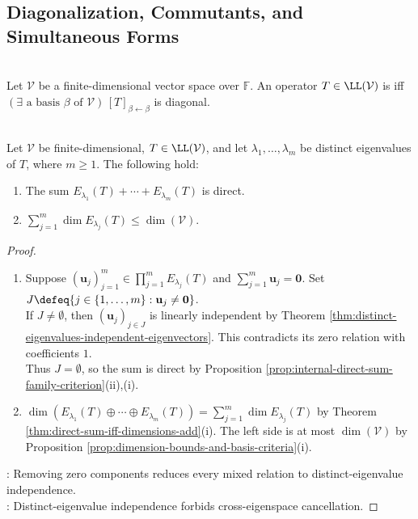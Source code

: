 \subsection{Diagonalization, Commutants, and Simultaneous Forms}

\begin{definition} \label{def:diagonalizable-operator} \\
Let $\mathcal{V}$ be a finite-dimensional vector space over $\mathbb{F}$. An operator $T\in\LL(\mathcal{V})$ is  iff $(\exists\text{ a basis }\beta\text{ of }\mathcal{V})\,[T]_{\beta\leftarrow\beta}$ is diagonal.
\end{definition}

\begin{proposition} \label{prop:eigenspaces-for-distinct-eigenvalues-form-direct-sum} \\
Let $\mathcal{V}$ be finite-dimensional, $T\in\LL(\mathcal{V})$, and let $\lambda_1,\ldots,\lambda_m$ be distinct eigenvalues of $T$, where $m\geq1$. The following hold:
\begin{enumerate}[label=(\roman*)]
\setlength{\itemsep}{0pt}
\item The sum $E_{\lambda_1}(T)+\cdots+E_{\lambda_m}(T)$ is direct.
\item $\sum\limits_{j=1}^{m}\dim E_{\lambda_j}(T)\leq\dim(\mathcal{V})$.
\end{enumerate}
\begin{proof}
\begin{enumerate}[label=(\roman*)]
\setlength{\itemsep}{0pt}
\item Suppose $(\mathbf{u}_j)_{j=1}^{m}\in\prod\limits_{j=1}^{m}E_{\lambda_j}(T)$ and $\sum\limits_{j=1}^{m}\mathbf{u}_j=\mathbf{0}$. Set $J\defeq\{j\in\{1,\ldots,m\}:\mathbf{u}_j\neq\mathbf{0}\}$.\\
If $J\neq\emptyset$, then $(\mathbf{u}_j)_{j\in J}$ is linearly independent by Theorem \ref{thm:distinct-eigenvalues-independent-eigenvectors}. This contradicts its zero relation with coefficients $1$.\\
Thus $J=\emptyset$, so the sum is direct by Proposition \ref{prop:internal-direct-sum-family-criterion}(ii),(i).
\item $\dim(E_{\lambda_1}(T)\oplus\cdots\oplus E_{\lambda_m}(T))=\sum\limits_{j=1}^{m}\dim E_{\lambda_j}(T)$ by Theorem \ref{thm:direct-sum-iff-dimensions-add}(i). The left side is at most $\dim(\mathcal{V})$ by Proposition \ref{prop:dimension-bounds-and-basis-criteria}(i).
\end{enumerate}
: Removing zero components reduces every mixed relation to distinct-eigenvalue independence.\\
: Distinct-eigenvalue independence forbids cross-eigenspace cancellation.
\end{proof}
\end{proposition}

